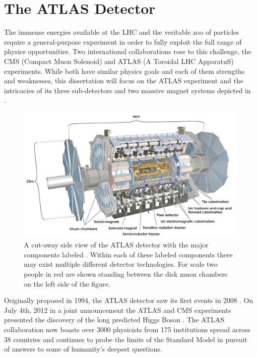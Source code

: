 \chapter{The ATLAS Detector} \label{chap:atlas}

The immense energies available at the LHC and the veritable zoo of particles
require a general-purpose experiment in order to fully exploit the full range
of physics opportunities.  Two international collaborations rose to this
challenge, the CMS (Compact Muon Solenoid) and ATLAS (A Toroidal LHC ApparatuS)
experiments.  While both have similar physics goals and each of them strengths
and weaknesses, this dissertation will focus on the ATLAS experiment and the
intricacies of its three sub-detectors and two massive magnet systems depicted
in .

\begin{figure}[!htbp]
  \begin{center}
    \includegraphics[width=0.9\linewidth]{figures/atlas/atlas_cutaway.pdf}
    \caption{A cut-away side view of the ATLAS detector with the major
components labeled \cite{PERF-2007-01}.  Within each of these labeled
components there may exist multiple different detector technologies.  For scale
two people in red are shown standing between the disk muon chambers on the left
side of the figure. }
    \label{fig:atlas_cutaway}
  \end{center}
\end{figure}

Originally proposed in 1994, the ATLAS detector saw its first events in  2008
\cite{ATLAS_TDR, ATLAS_first_beam}. On July 4th, 2012 in a joint announcement
the ATLAS and CMS experiments presented the discovery of the long predicted
Higgs Boson \cite{Aad:2012tfa, Chatrchyan:2012xdj, higgs_announcement}.  The
ATLAS collaboration now boasts over 3000 physicists from 175 institutions
spread across 38 countries and continues to probe the limits of the Standard
Model in pursuit of answers to some of humanity's deepest questions.

